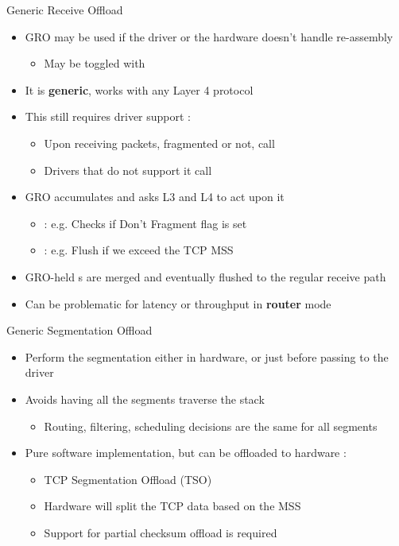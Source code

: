 \begin{frame}{Generic Receive Offload}
	\begin{itemize}
		\item GRO may be used if the driver or the hardware doesn't handle re-assembly
			\begin{itemize}
				\item May be toggled with 
			\end{itemize}
		\item It is \textbf{generic}, works with any Layer 4 protocol
		\item This still requires driver support :
			\begin{itemize}
				\item Upon receiving packets, fragmented or not, call 
				\item Drivers that do not support it call 
			\end{itemize}
		\item GRO accumulates  and asks L3 and L4 to act upon it
			\begin{itemize}
				\item {} : e.g. Checks if Don't Fragment flag is set
				\item {} : e.g. Flush if we exceed the TCP MSS
			\end{itemize}
		\item GRO-held s are merged and eventually flushed to the regular receive path
		\item Can be problematic for latency or throughput in \textbf{router} mode
	\end{itemize}
\end{frame}

\begin{frame}{Generic Segmentation Offload}
	\begin{itemize}
		\item Perform the segmentation either in hardware, or just before passing to the driver
		\item Avoids having all the segments traverse the stack
			\begin{itemize}
				\item Routing, filtering, scheduling decisions are the same for all segments
			\end{itemize}
		\item Pure software implementation, but can be offloaded to hardware :
			\begin{itemize}
				\item TCP Segmentation Offload (TSO)
				\item Hardware will split the TCP data based on the MSS
				\item Support for partial checksum offload is required
			\end{itemize}
	\end{itemize}
\end{frame}

